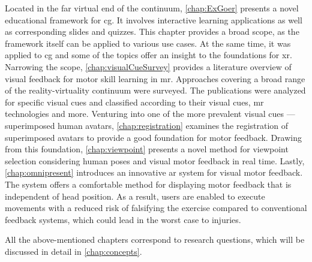 Located in the far virtual end of the continuum, \autoref{chap:ExGoer} presents a novel educational framework for \Acrfull{cg}.
It involves interactive learning applications as well as corresponding slides and quizzes.
This chapter provides a broad scope, as the framework itself can be applied to various use cases.
At the same time, it was applied to \acrshort{cg} and some of the topics offer an insight to the foundations for \acrshort{xr}.
Narrowing the scope, \autoref{chap:visualCueSurvey} provides a literature overview of visual feedback for motor skill learning in \acrshort{mr}.
Approaches covering a broad range of the reality-virtuality continuum were surveyed.
The publications were analyzed for specific visual cues and classified according to their visual cues, \acrshort{mr} technologies and more.
Venturing into one of the more prevalent visual cues --- superimposed human avatars, \autoref{chap:registration} examines the registration of superimposed avatars to provide a good foundation for motor feedback.
Drawing from this foundation, \autoref{chap:viewpoint} presents a novel method for viewpoint selection considering human poses and visual motor feedback in real time.
Lastly, \autoref{chap:omnipresent} introduces an innovative \acrshort{ar} system for visual motor feedback.
The system offers a comfortable method for displaying motor feedback that is independent of head position.
As a result, users are enabled to execute movements with a reduced risk of falsifying the exercise compared to conventional feedback systems, which could lead in the worst case to injuries.

All the above-mentioned chapters correspond to research questions, which will be discussed in detail in \autoref{chap:concepts}.


